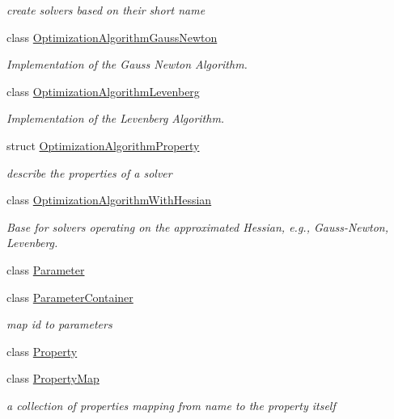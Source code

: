\begin{DoxyCompactItemize}
\begin{DoxyCompactList}\small\item\em create solvers based on their short name \end{DoxyCompactList}\item 
class \hyperlink{classg2o_1_1OptimizationAlgorithmGaussNewton}{Optimization\+Algorithm\+Gauss\+Newton}
\begin{DoxyCompactList}\small\item\em Implementation of the Gauss Newton Algorithm. \end{DoxyCompactList}\item 
class \hyperlink{classg2o_1_1OptimizationAlgorithmLevenberg}{Optimization\+Algorithm\+Levenberg}
\begin{DoxyCompactList}\small\item\em Implementation of the Levenberg Algorithm. \end{DoxyCompactList}\item 
struct \hyperlink{structg2o_1_1OptimizationAlgorithmProperty}{Optimization\+Algorithm\+Property}
\begin{DoxyCompactList}\small\item\em describe the properties of a solver \end{DoxyCompactList}\item 
class \hyperlink{classg2o_1_1OptimizationAlgorithmWithHessian}{Optimization\+Algorithm\+With\+Hessian}
\begin{DoxyCompactList}\small\item\em Base for solvers operating on the approximated Hessian, e.\+g., Gauss-\/\+Newton, Levenberg. \end{DoxyCompactList}\item 
class \hyperlink{classg2o_1_1Parameter}{Parameter}
\item 
class \hyperlink{classg2o_1_1ParameterContainer}{Parameter\+Container}
\begin{DoxyCompactList}\small\item\em map id to parameters \end{DoxyCompactList}\item 
class \hyperlink{classg2o_1_1Property}{Property}
\item 
class \hyperlink{classg2o_1_1PropertyMap}{Property\+Map}
\begin{DoxyCompactList}\small\item\em a collection of properties mapping from name to the property itself \end{DoxyCompactList}\item 

\end{DoxyCompactItemize}
